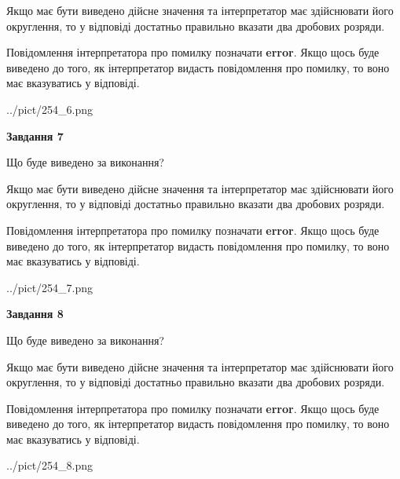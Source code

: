 \documentclass[12pt, ukrainian]{article}
\begin{document}
{\begin {Large}
Якщо має бути виведено дійсне значення та інтерпретатор має здійснювати його округлення, 
то у відповіді достатньо правильно вказати два дробових розряди.

Повідомлення інтерпретатора про помилку позначати \textbf{error}.
Якщо щось буде виведено до того, як інтерпретатор видасть повідомлення про помилку, 
то воно має вказуватись у відповіді. \par

\begin{center}
	{../pict/254_6.png}
\end{center}
\newpage

{\begin {center}\textbf{Завдання 7}\end {center}}\par
Що буде виведено за виконання? \par

Якщо має бути виведено дійсне значення та інтерпретатор має здійснювати його округлення, 
то у відповіді достатньо правильно вказати два дробових розряди.

Повідомлення інтерпретатора про помилку позначати \textbf{error}.
Якщо щось буде виведено до того, як інтерпретатор видасть повідомлення про помилку, 
то воно має вказуватись у відповіді. \par

\begin{center}
	{../pict/254_7.png}
\end{center}
\newpage

{\begin {center}\textbf{Завдання 8}\end {center}}\par
Що буде виведено за виконання? \par

Якщо має бути виведено дійсне значення та інтерпретатор має здійснювати його округлення, 
то у відповіді достатньо правильно вказати два дробових розряди.

Повідомлення інтерпретатора про помилку позначати \textbf{error}.
Якщо щось буде виведено до того, як інтерпретатор видасть повідомлення про помилку, 
то воно має вказуватись у відповіді. \par

\begin{center}
	{../pict/254_8.png}
\end{center}
\newpage


\end{Large}}
\end{document}
